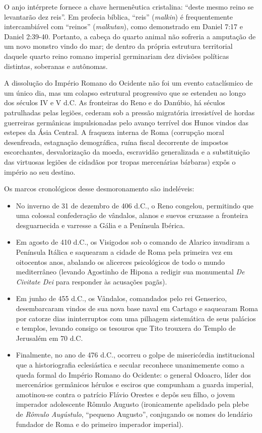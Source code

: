 O anjo intérprete fornece a chave hermenêutica cristalina: ``deste mesmo reino se levantarão dez reis''. Em profecia bíblica, ``reis'' (\textit{malkin}) é frequentemente intercambiável com ``reinos'' (\textit{malkutan}), como demonstrado em Daniel 7:17 e Daniel 2:39-40.
Portanto, a cabeça do quarto animal não sofreria a amputação de um novo monstro vindo do mar; de dentro da própria estrutura territorial daquele quarto reino romano imperial germinariam dez divisões políticas distintas, soberanas e autônomas.

A dissolução do Império Romano do Ocidente não foi um evento cataclísmico de um único dia, mas um colapso estrutural progressivo que se estendeu ao longo dos séculos IV e V d.C. As fronteiras do Reno e do Danúbio, há séculos patrulhadas pelas legiões, cederam sob a pressão migratória irresistível de hordas guerreiras germânicas impulsionadas pelo avanço terrível dos Hunos vindos das estepes da Ásia Central.
A fraqueza interna de Roma (corrupção moral desenfreada, estagnação demográfica, ruína fiscal decorrente de impostos escorchantes, desvalorização da moeda, escravidão generalizada e a substituição das virtuosas legiões de cidadãos por tropas mercenárias bárbaras) expôs o império ao seu destino.

Os marcos cronológicos desse desmoronamento são indeléveis:
\begin{itemize}
  \item No inverno de 31 de dezembro de 406 d.C., o Reno congelou, permitindo que uma colossal confederação de vândalos, alanos e suevos cruzasse a fronteira desguarnecida e varresse a Gália e a Península Ibérica.
  \item Em agosto de 410 d.C., os Visigodos sob o comando de Alarico invadiram a Península Itálica e saquearam a cidade de Roma pela primeira vez em oitocentos anos, abalando os alicerces psicológicos de todo o mundo mediterrâneo (levando Agostinho de Hipona a redigir sua monumental \textit{De Civitate Dei} para responder às acusações pagãs).
  \item Em junho de 455 d.C., os Vândalos, comandados pelo rei Genserico, desembarcaram vindos de sua nova base naval em Cartago e saquearam Roma por catorze dias ininterruptos com uma pilhagem sistemática de seus palácios e templos, levando consigo os tesouros que Tito trouxera do Templo de Jerusalém em 70 d.C.
  \item Finalmente, no ano de 476 d.C., ocorreu o golpe de misericórdia institucional que a historiografia eclesiástica e secular reconhece unanimemente como a queda formal do Império Romano do Ocidente: o general Odoacro, líder dos mercenários germânicos hérulos e esciros que compunham a guarda imperial, amotinou-se contra o patrício Flávio Orestes e depôs seu filho, o jovem imperador adolescente Rômulo Augusto (ironicamente apelidado pela plebe de \textit{Rômulo Augústulo}, ``pequeno Augusto'', conjugando os nomes do lendário fundador de Roma e do primeiro imperador imperial).
\end{itemize}

